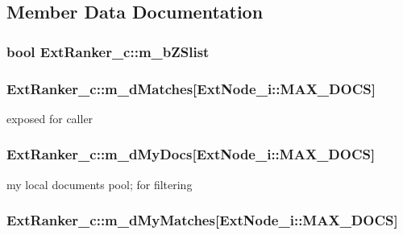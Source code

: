 \subsection{Member Data Documentation}
\hypertarget{classExtRanker__c_ac3db9a33990d7193adb106f5e8f5109e}{
\subsubsection[{m\-\_\-b\-Z\-Slist}]{\setlength{\rightskip}{0pt plus 5cm}bool Ext\-Ranker\-\_\-c\-::m\-\_\-b\-Z\-Slist\hspace{0.3cm}{\ttfamily [protected]}}}\label{classExtRanker__c_ac3db9a33990d7193adb106f5e8f5109e}
\hypertarget{classExtRanker__c_aac790cfc4c2da89f8e71218c1d0e777f}{
\subsubsection[{m\-\_\-d\-Matches}]{ Ext\-Ranker\-\_\-c\-::m\-\_\-d\-Matches\mbox{[}{\bf Ext\-Node\-\_\-i\-::\-M\-A\-X\-\_\-\-D\-O\-C\-S}\mbox{]}}}\label{classExtRanker__c_aac790cfc4c2da89f8e71218c1d0e777f}


exposed for caller 

\hypertarget{classExtRanker__c_ac099a844b02367ca2ed04916d6041372}{
\subsubsection[{m\-\_\-d\-My\-Docs}]{ Ext\-Ranker\-\_\-c\-::m\-\_\-d\-My\-Docs\mbox{[}{\bf Ext\-Node\-\_\-i\-::\-M\-A\-X\-\_\-\-D\-O\-C\-S}\mbox{]}\hspace{0.3cm}{\ttfamily [protected]}}}\label{classExtRanker__c_ac099a844b02367ca2ed04916d6041372}


my local documents pool; for filtering 

\hypertarget{classExtRanker__c_a1392b68deaa7087016c178505864dc89}{
\subsubsection[{m\-\_\-d\-My\-Matches}]{ Ext\-Ranker\-\_\-c\-::m\-\_\-d\-My\-Matches\mbox{[}{\bf Ext\-Node\-\_\-i\-::\-M\-A\-X\-\_\-\-D\-O\-C\-S}\mbox{]}\hspace{0.3cm}{\ttfamily [protected]}}}\label{classExtRanker__c_a1392b68deaa7087016c178505864dc89}


